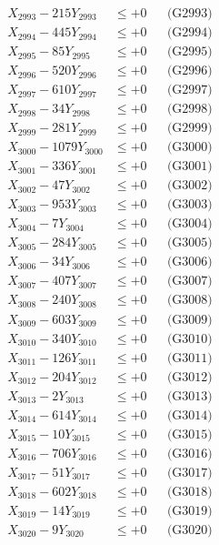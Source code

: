 \documentclass[a4paper,10pt]{article}
\begin{document}
{\begin{align}
X_{2993} - 215Y_{2993} &\leq +0 && \text{(G2993)} \\
X_{2994} - 445Y_{2994} &\leq +0 && \text{(G2994)} \\
X_{2995} - 85Y_{2995} &\leq +0 && \text{(G2995)} \\
X_{2996} - 520Y_{2996} &\leq +0 && \text{(G2996)} \\
X_{2997} - 610Y_{2997} &\leq +0 && \text{(G2997)} \\
X_{2998} - 34Y_{2998} &\leq +0 && \text{(G2998)} \\
X_{2999} - 281Y_{2999} &\leq +0 && \text{(G2999)} \\
X_{3000} - 1079Y_{3000} &\leq +0 && \text{(G3000)} \\
\allowbreak
X_{3001} - 336Y_{3001} &\leq +0 && \text{(G3001)} \\
X_{3002} - 47Y_{3002} &\leq +0 && \text{(G3002)} \\
X_{3003} - 953Y_{3003} &\leq +0 && \text{(G3003)} \\
X_{3004} - 7Y_{3004} &\leq +0 && \text{(G3004)} \\
X_{3005} - 284Y_{3005} &\leq +0 && \text{(G3005)} \\
X_{3006} - 34Y_{3006} &\leq +0 && \text{(G3006)} \\
X_{3007} - 407Y_{3007} &\leq +0 && \text{(G3007)} \\
X_{3008} - 240Y_{3008} &\leq +0 && \text{(G3008)} \\
X_{3009} - 603Y_{3009} &\leq +0 && \text{(G3009)} \\
X_{3010} - 340Y_{3010} &\leq +0 && \text{(G3010)} \\
\allowbreak
X_{3011} - 126Y_{3011} &\leq +0 && \text{(G3011)} \\
X_{3012} - 204Y_{3012} &\leq +0 && \text{(G3012)} \\
X_{3013} - 2Y_{3013} &\leq +0 && \text{(G3013)} \\
X_{3014} - 614Y_{3014} &\leq +0 && \text{(G3014)} \\
X_{3015} - 10Y_{3015} &\leq +0 && \text{(G3015)} \\
X_{3016} - 706Y_{3016} &\leq +0 && \text{(G3016)} \\
X_{3017} - 51Y_{3017} &\leq +0 && \text{(G3017)} \\
X_{3018} - 602Y_{3018} &\leq +0 && \text{(G3018)} \\
X_{3019} - 14Y_{3019} &\leq +0 && \text{(G3019)} \\
X_{3020} - 9Y_{3020} &\leq +0 && \text{(G3020)} \\

\end{align}}
\end{document}
